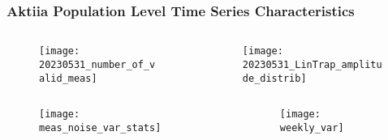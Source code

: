 \documentclass[
	8pt, %
]{beamer}
\begin{document}
\begin{frame}[fragile]
	\frametitle{Aktiia Population Level Time Series Characteristics}

	\begin{columns}[c] %
		\begin{column}{0.45\textwidth} %
				\begin{figure}
					\texttt{[image: 20230531\_number\_of\_valid\_meas]}
				\end{figure}
		\end{column}
		\begin{column}{0.5\textwidth} %
				\begin{figure}
					\texttt{[image: 20230531\_LinTrap\_amplitude\_distrib]}
				\end{figure}

		\end{column}
	\end{columns}
	\begin{columns}[c] %
		\begin{column}{0.45\textwidth} %
				\begin{figure}
					\texttt{[image: meas\_noise\_var\_stats]}
				\end{figure}
		\end{column}
		\begin{column}{0.5\textwidth} %
				\begin{figure}
					\texttt{[image: weekly\_var]}
				\end{figure}

		\end{column}
	\end{columns}


\end{frame}
\end{document}
